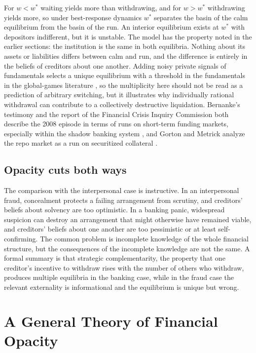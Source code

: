 \documentclass[11pt]{article}
\theoremstyle{definition}
\theoremstyle{remark}
\begin{document}
For $w<w^\ast$ waiting yields more than withdrawing, and for $w>w^\ast$ withdrawing yields more, so under best-response dynamics $w^\ast$ separates the basin of the calm equilibrium from the basin of the run. An interior equilibrium exists at $w^\ast$ with depositors indifferent, but it is unstable. The model has the property noted in the earlier sections: the institution is the same in both equilibria. Nothing about its assets or liabilities differs between calm and run, and the difference is entirely in the beliefs of creditors about one another. Adding noisy private signals of fundamentals selects a unique equilibrium with a threshold in the fundamentals in the global-games literature \cite{morris1998,goldstein2005}, so the multiplicity here should not be read as a prediction of arbitrary switching, but it illustrates why individually rational withdrawal can contribute to a collectively destructive liquidation. Bernanke's testimony and the report of the Financial Crisis Inquiry Commission both describe the 2008 episode in terms of runs on short-term funding markets, especially within the shadow banking system \cite{bernanke2010,fcic2011}, and Gorton and Metrick analyze the repo market as a run on securitized collateral \cite{gorton2012}.

\subsection{Opacity cuts both ways}

The comparison with the interpersonal case is instructive. In an interpersonal fraud, concealment protects a failing arrangement from scrutiny, and creditors' beliefs about solvency are too optimistic. In a banking panic, widespread suspicion can destroy an arrangement that might otherwise have remained viable, and creditors' beliefs about one another are too pessimistic or at least self-confirming. The common problem is incomplete knowledge of the whole financial structure, but the consequences of the incomplete knowledge are not the same. A formal summary is that strategic complementarity, the property that one creditor's incentive to withdraw rises with the number of others who withdraw, produces multiple equilibria in the banking case, while in the fraud case the relevant externality is informational and the equilibrium is unique but wrong.

\section{A General Theory of Financial Opacity}\label{sec:opacity}
\end{document}
